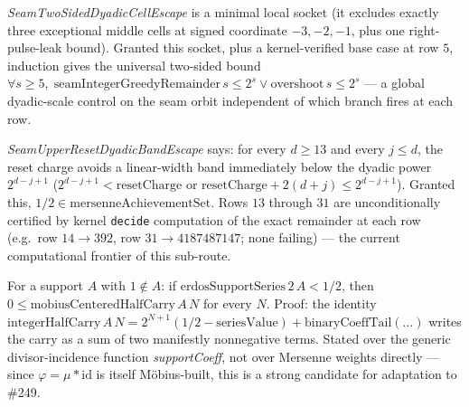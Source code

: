 \begin{thm}
\label{thm:two-sided-dyadic}
\emph{SeamTwoSidedDyadicCellEscape} is a minimal local socket (it excludes exactly three
exceptional middle cells at signed coordinate $-3,-2,-1$, plus one right-pulse-leak
bound). Granted this socket, plus a kernel-verified base case at row $5$, induction gives
the universal two-sided bound $\forall s\ge 5,\;
\mathrm{seamIntegerGreedyRemainder}\,s\le 2^s \lor \mathrm{overshoot}\,s\le 2^s$ —
a global dyadic-scale control on the seam orbit independent of which branch fires at each
row.
\par{}
\end{thm}

\begin{thm}
\label{thm:upper-reset-band}
\emph{SeamUpperResetDyadicBandEscape} says: for every $d\ge 13$ and every $j\le d$, the
reset charge avoids a linear-width band immediately below the dyadic power
$2^{d-j+1}$ ($2^{d-j+1}<\mathrm{resetCharge}$ or
$\mathrm{resetCharge}+2(d+j)\le 2^{d-j+1}$). Granted this, $1/2\in
\mathrm{mersenneAchievementSet}$. Rows $13$ through $31$ are unconditionally certified by
kernel \texttt{decide} computation of the exact remainder at each row (e.g.\ row $14\to
392$, row $31\to 4187487147$; none failing) — the current computational frontier of this
sub-route.
\par{}
\end{thm}

\begin{thm}
\label{thm:mobius-centred-nonneg}
For a support $A$ with $1\notin A$: if $\mathrm{erdosSupportSeries}\,2\,A<1/2$, then
$0\le\mathrm{mobiusCenteredHalfCarry}\,A\,N$ for every $N$. Proof: the identity
$\mathrm{integerHalfCarry}\,A\,N = 2^{N+1}(1/2-\mathrm{seriesValue}) +
\mathrm{binaryCoeffTail}(\dots)$ writes the carry as a sum of two manifestly nonnegative
terms. Stated over the generic divisor-incidence function \emph{supportCoeff}, not over
Mersenne weights directly — since $\varphi=\mu * \mathrm{id}$ is itself
M\"obius-built, this is a strong candidate for adaptation to \#249.
\par{}
\end{thm}

